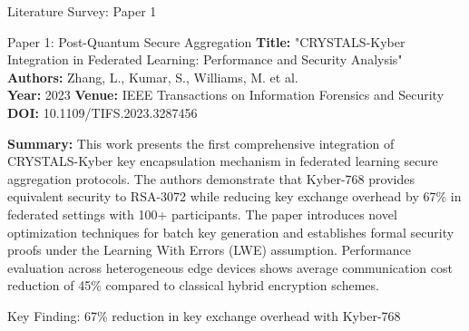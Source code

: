 \documentclass[aspectratio=169,11pt]{beamer}
\begin{document}
\begin{frame}{Literature Survey: Paper 1}

\begin{block}{Paper 1: Post-Quantum Secure Aggregation}
\textbf{Title:} "CRYSTALS-Kyber Integration in Federated Learning: Performance and Security Analysis"\\
\textbf{Authors:} Zhang, L., Kumar, S., Williams, M. et al.\\
\textbf{Year:} 2023 \textbf{Venue:} IEEE Transactions on Information Forensics and Security\\
\textbf{DOI:} 10.1109/TIFS.2023.3287456

\textbf{Summary:} This work presents the first comprehensive integration of CRYSTALS-Kyber key encapsulation mechanism in federated learning secure aggregation protocols. The authors demonstrate that Kyber-768 provides equivalent security to RSA-3072 while reducing key exchange overhead by 67\% in federated settings with 100+ participants. The paper introduces novel optimization techniques for batch key generation and establishes formal security proofs under the Learning With Errors (LWE) assumption. Performance evaluation across heterogeneous edge devices shows average communication cost reduction of 45\% compared to classical hybrid encryption schemes.
\end{block}

\begin{center}
\footnotesize{Key Finding: 67\% reduction in key exchange overhead with Kyber-768}
\end{center}

\end{frame}
\end{document}
